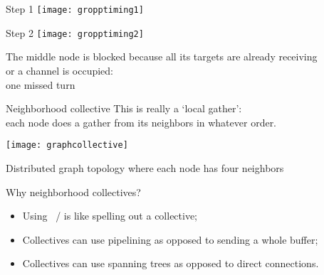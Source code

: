 \begin{numberedframe}{Step 1}
  \texttt{[image: gropptiming1]}
\end{numberedframe}

\begin{numberedframe}{Step 2}
  \texttt{[image: gropptiming2]}

  The middle node is blocked because all its targets
  are already receiving\\
  or a channel is occupied:\\
  one missed turn
\end{numberedframe}

\begin{numberedframe}{Neighborhood collective}
  \label{fig:graphcollective}
  This is really a `local gather':\\
  each node does a gather from its neighbors in whatever order.\\

  \texttt{[image: graphcollective]}

  Distributed graph topology where each
  node has four neighbors
\end{numberedframe}

\begin{numberedframe}{Why neighborhood collectives?}
  \begin{itemize}
  \item Using ~/  is like spelling out a collective;
  \item Collectives can use pipelining as opposed to sending  a whole
    buffer;
  \item Collectives can use spanning trees as opposed to direct connections.
  \end{itemize}
\end{numberedframe}

